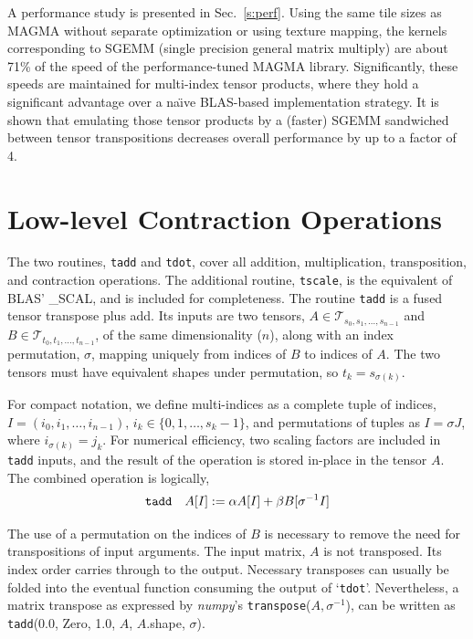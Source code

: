 \documentclass{sigplanconf}
\begin{document}
  A performance study is presented in Sec.~\ref{s:perf}.  Using the same tile
sizes as MAGMA without separate optimization
or using texture mapping, the kernels corresponding to SGEMM (single precision
general matrix multiply) are about 71\%
of the speed of the performance-tuned MAGMA library.
Significantly, these speeds are maintained
for multi-index tensor products, where they hold a significant advantage over a na\"{\i}ve
BLAS-based implementation strategy.
It is shown that emulating those tensor products by a
(faster) SGEMM sandwiched between tensor transpositions
decreases overall performance by up to a factor of 4.

\section{ Low-level Contraction Operations}\label{s:low}

  The two routines, {\tt tadd} and {\tt tdot}, cover all addition, multiplication, transposition,
and contraction operations.  The additional routine, {\tt tscale}, is the equivalent of BLAS' \_SCAL,
and is included for completeness.
The routine {\tt tadd} is a fused tensor transpose plus add.
Its inputs are two tensors, $A \in \mathcal T_{s_0,s_1,\ldots,s_{n-1}}$
and $B \in \mathcal T_{t_0,t_1,\ldots,t_{n-1}}$, of the same dimensionality ($n$),
along with an index permutation, $\sigma$, mapping uniquely from indices of $B$ to indices of $A$.
The two tensors must have equivalent shapes under permutation, so $t_k = s_{\sigma(k)}$.

  For compact notation, we define multi-indices as a complete tuple of indices,
$I = (i_0, i_1, \ldots, i_{n-1})$, $i_k \in \{0,1,\ldots,s_k-1\}$, and permutations of tuples as
$I = \sigma J$, where $i_{\sigma(k)} = j_k$.
For numerical efficiency, two scaling factors are included in {\tt tadd}
inputs, and the result of the operation is stored in-place in the tensor $A$.
The combined operation is logically,
\begin{equation}
\text{\tt tadd} \quad A[I] := \alpha A[I] + \beta B[\sigma^{-1} I]
\end{equation}

  The use of a permutation on the indices of $B$ is necessary to remove the need
for transpositions of input arguments.  The input matrix, $A$ is not transposed.
Its index order carries through to the output.  Necessary transposes can usually
be folded into the eventual function consuming the output of `{\tt tdot}'.  Nevertheless,
a matrix transpose as expressed by {\em numpy}'s {\tt transpose}($A, \sigma^{-1}$),
can be written as {\tt tadd}(0.0, Zero, 1.0, $A$, $A$.shape, $\sigma$).
\end{document}
